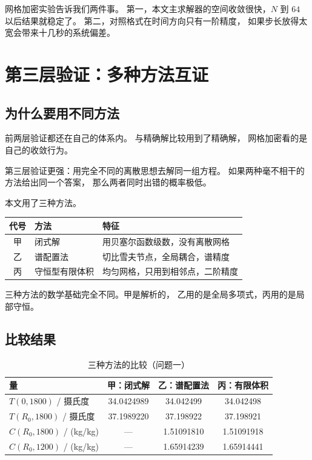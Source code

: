 \keypoint
网格加密实验告诉我们两件事。
第一，本文主求解器的空间收敛很快，$N$ 到 $64$ 以后结果就稳定了。
第二，对照格式在时间方向只有一阶精度，
如果步长放得太宽会带来十几秒的系统偏差。

\section{第三层验证：多种方法互证}

\subsection{为什么要用不同方法}

前两层验证都还在自己的体系内。
与精确解比较用到了精确解，
网格加密看的是自己的收敛行为。

第三层验证更强：用完全不同的离散思想去解同一组方程。
如果两种毫不相干的方法给出同一个答案，
那么两者同时出错的概率极低。

本文用了三种方法。

\begin{center}
\begin{tabular}{@{}clp{7.4cm}@{}}
\toprule
代号 & 方法 & 特征 \\
\midrule
甲 & 闭式解 & 用贝塞尔函数级数，没有离散网格 \\
乙 & 谱配置法 & 切比雪夫节点，全局耦合，谱精度 \\
丙 & 守恒型有限体积 & 均匀网格，只用到相邻点，二阶精度 \\
\bottomrule
\end{tabular}
\end{center}

三种方法的数学基础完全不同。甲是解析的，
乙用的是全局多项式，丙用的是局部守恒。

\subsection{比较结果}

\begin{table}[H]
\centering
\small
\caption{三种方法的比较（问题一）}
\begin{tabular}{@{}lccc@{}}
\toprule
量 & 甲：闭式解 & 乙：谱配置法 & 丙：有限体积 \\
\midrule
$T(0,1800)$ / 摄氏度 & 34.0424989 & 34.042499 & 34.042498 \\
$T(R_0,1800)$ / 摄氏度 & 37.1989220 & 37.198922 & 37.198921 \\
$C(R_0,1800)$ / (kg/kg) & --- & 1.51091810 & 1.51091918 \\
$C(R_0,1200)$ / (kg/kg) & --- & 1.65914239 & 1.65914441 \\
\bottomrule
\end{tabular}
\end{table}

